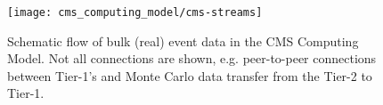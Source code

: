 \begin{figure}[!tbp]
  \centering
  \texttt{[image: cms\_computing\_model/cms-streams]}
  \caption{Schematic flow of bulk (real) event data in the CMS Computing Model.
           Not all connections are shown, e.g. peer-to-peer connections between Tier-1's and Monte Carlo data transfer from the Tier-2 to Tier-1.~\cite{CMS_TDR_PHYS_vol1}
  \label{fig:streams}}
\end{figure}







